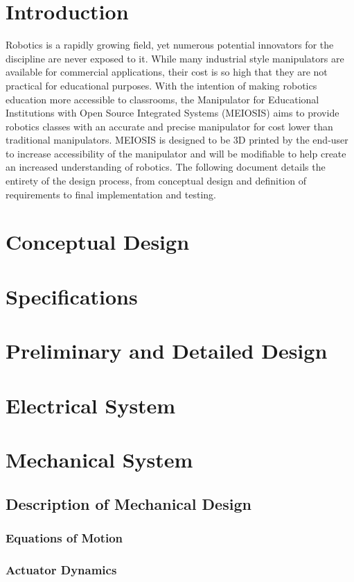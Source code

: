 \section{Introduction}
Robotics is a rapidly growing field, yet numerous potential innovators for the discipline are never exposed to it. While many industrial style manipulators are available for commercial applications, their cost is so high that they are not practical for educational purposes. With the intention of making robotics education more accessible to classrooms, the Manipulator for Educational Institutions with Open Source Integrated Systems (MEIOSIS) aims to provide robotics classes with an accurate and precise manipulator for cost lower than traditional manipulators. MEIOSIS is designed to be 3D printed by the end-user to increase accessibility of the manipulator and will be modifiable to help create an increased understanding of robotics. The following document details the entirety of the design process, from conceptual design and definition of requirements to final implementation and testing.
\section{Conceptual Design}

\newpage
\section{Specifications}

\newpage
\section{Preliminary and Detailed Design}
\section{Electrical System}
\section{Mechanical System}
\subsection*{Description of Mechanical Design}

\subsubsection*{Equations of Motion}

\subsubsection*{Actuator Dynamics}

